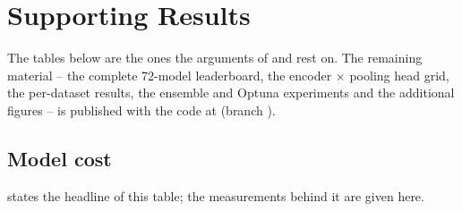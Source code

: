 %

\section{Supporting Results}
\label{app:additional}

The tables below are the ones the arguments of  and  rest
on. The remaining material -- the complete 72-model leaderboard, the encoder $\times$ pooling head
grid, the per-dataset \ucr{} results, the ensemble and Optuna experiments and the additional
figures -- is published with the code at \repolink{} (branch \repobranch{}).

\subsection{Model cost}
\label{app:cost}

 states the headline of this table; the measurements behind it are given here.

